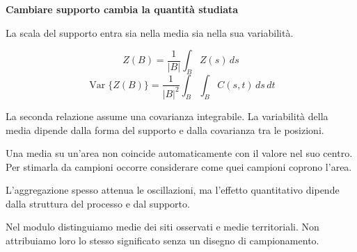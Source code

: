 \documentclass[12pt,aspectratio=1610]{beamer}
\newcommand{\PBody}[1]{\par{\fontsize{11.3}{14.8}\selectfont #1\par}}
\newcommand{\PSmall}[1]{\par{\fontsize{9.8}{13.1}\selectfont #1\par}}
\newcommand{\PInfo}[1]{%
\begin{tcolorbox}[enhanced,arc=1.6mm,boxrule=.55pt,colback=GeoTint,
 colframe=Rule!80!Classical,left=2.3mm,right=2.3mm,top=2mm,bottom=2mm,
 before skip=1mm,after skip=1mm]
\PSmall{#1}\end{tcolorbox}}
\begin{document}
\begin{frame}[plain]\hypertarget{slide10}{}
\begin{lrbox}{\TitleBox}
\begin{minipage}[t]{17.7cm}\raggedright\color{Ink}\fontsize{11.3}{14.8}\selectfont
\color{Navy}\bfseries\fontsize{20.6}{24.5}\selectfont Cambiare supporto cambia la quantità studiata
\end{minipage}\end{lrbox}

\begin{lrbox}{\RecallBox}
\begin{minipage}[t]{14.3cm}\raggedright\color{Ink}\fontsize{11.3}{14.8}\selectfont
\fontsize{10.3}{13.8}\selectfont La scala del supporto entra sia nella media sia nella sua variabilità.
\end{minipage}\end{lrbox}

\begin{lrbox}{\PilotLeftBox}
\begin{minipage}[t]{10.05cm}\raggedright\color{Ink}\fontsize{11.3}{14.8}\selectfont
\[Z(B)=\frac{1}{|B|}\int_B Z(s)\,ds\]
\[\operatorname{Var}\{Z(B)\}=\frac{1}{|B|^2}\int_B\int_B C(s,t)\,ds\,dt\]
\PInfo{La seconda relazione assume una covarianza integrabile. La variabilità della media dipende dalla forma del supporto e dalla covarianza tra le posizioni.}

\end{minipage}\end{lrbox}

\begin{lrbox}{\PilotRightBox}
\begin{minipage}[t]{7.55cm}\raggedright\color{Ink}\fontsize{11.3}{14.8}\selectfont
\PBody{Una media su un’area non coincide automaticamente con il valore nel suo centro. Per stimarla da campioni occorre considerare come quei campioni coprono l’area.}
\vspace{2.5mm}
\PBody{L’aggregazione spesso attenua le oscillazioni, ma l’effetto quantitativo dipende dalla struttura del processo e dal supporto.}
\vspace{2.5mm}
\PSmall{Nel modulo distinguiamo medie dei siti osservati e medie territoriali. Non attribuiamo loro lo stesso significato senza un disegno di campionamento.}


\end{minipage}
\end{lrbox}
\end{frame}
\end{document}
